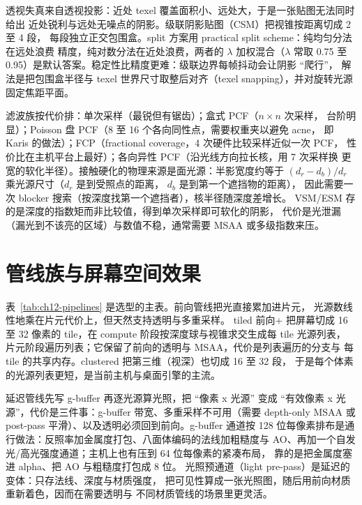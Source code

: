 \documentclass[12pt,a4paper,fontset=fandol]{ctexbook}
\begin{document}
透视失真来自透视投影：近处 texel 覆盖面积小、远处大，于是一张贴图无法同时给出
近处锐利与远处无噪点的阴影。级联阴影贴图（CSM）把视锥按距离切成 2 至 4 段，
每段独立正交包围盒。split 方案用 practical split scheme：纯均匀分法在远处浪费
精度，纯对数分法在近处浪费，两者的 \(\lambda\) 加权混合（\(\lambda\) 常取
0.75 至 0.95）是默认答案。稳定性比精度更难：级联边界每帧抖动会让阴影 ``爬行''，
解法是把包围盒半径与 texel 世界尺寸取整后对齐（texel snapping），并对旋转光源
固定焦距平面。

滤波族按代价排：单次采样（最锐但有锯齿）；盒式 PCF（\(n\times n\) 次采样，
台阶明显）；Poisson 盘 PCF（8 至 16 个各向同性点，需要权重夹以避免 acne，
即 Karis 的做法）；FCP（fractional coverage，4 次硬件比较采样近似一次 PCF，
性价比在主机平台上最好）；各向异性 PCF（沿光线方向拉长核，用 7 次采样换
更宽的软化半径）。接触硬化的物理来源是面光源：半影宽度约等于
\((d_{r}-d_{b})/d_{r}\) 乘光源尺寸（\(d_{r}\) 是到受照点的距离，
\(d_{b}\) 是到第一个遮挡物的距离），
因此需要一次 blocker 搜索（按深度找第一个遮挡者），核半径随深度差增长。
VSM/ESM 存的是深度的指数矩而非比较值，得到单次采样即可软化的阴影，
代价是光泄漏（漏光到不该亮的区域）与数值不稳，通常需要 MSAA 或多级指数来压。

\section{管线族与屏幕空间效果}

表~\ref{tab:ch12-pipelines} 是选型的主表。前向管线把光直接累加进片元，
光源数线性地乘在片元代价上，但天然支持透明与多重采样。 tiled 前向+ 把屏幕切成
16 至 32 像素的 tile，在 compute 阶段按深度球与视锥求交生成每 tile 光源列表，
片元阶段遍历列表；它保留了前向的透明与 MSAA，代价是列表遍历的分支与
每 tile 的共享内存。clustered 把第三维（视深）也切成 16 至 32 段，
于是每个体素的光源列表更短，是当前主机与桌面引擎的主流。

延迟管线先写 g-buffer 再逐光源算光照，把 ``像素 x 光源'' 变成
``有效像素 x 光源''，代价是三件事：g-buffer 带宽、多重采样不可用（需要
depth-only MSAA 或 post-pass 平滑）、以及透明必须回到前向。g-buffer 通道按
128 位每像素排布是通行做法：反照率加金属度打包、八面体编码的法线加粗糙度与
AO、再加一个自发光/高光强度通道；主机上也有压到 64 位每像素的紧凑布局，
靠的是把金属度塞进 alpha、把 AO 与粗糙度打包成 8 位。
光照预通道（light pre-pass）是延迟的变体：只存法线、深度与材质强度，
把可见性算成一张光照图，随后用前向材质重新着色，因而在需要透明与
不同材质管线的场景里更灵活。
\end{document}
